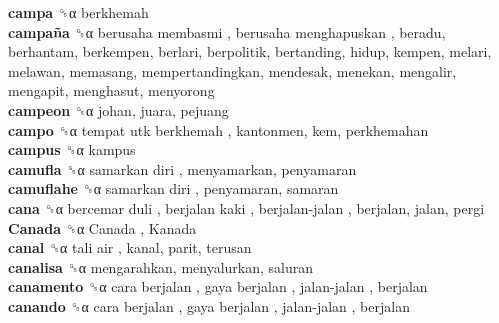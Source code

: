 \textbf{campa} ␝α  berkhemah  \\
\textbf{campaña} ␝α   berusaha membasmi ,  berusaha menghapuskan , beradu, berhantam, berkempen, berlari, berpolitik, bertanding, hidup, kempen, melari, melawan, memasang, mempertandingkan, mendesak, menekan, mengalir, mengapit, menghasut, menyorong  \\
\textbf{campeon} ␝α  johan, juara, pejuang  \\
\textbf{campo} ␝α   tempat utk berkhemah , kantonmen, kem, perkhemahan  \\
\textbf{campus} ␝α  kampus  \\
\textbf{camufla} ␝α   samarkan diri , menyamarkan, penyamaran  \\
\textbf{camuflahe} ␝α   samarkan diri , penyamaran, samaran  \\
\textbf{cana} ␝α   bercemar duli ,  berjalan kaki ,  berjalan-jalan , berjalan, jalan, pergi  \\
\textbf{Canada} ␝α   Canada ,  Kanada   \\
\textbf{canal} ␝α   tali air , kanal, parit, terusan  \\
\textbf{canalisa} ␝α  mengarahkan, menyalurkan, saluran  \\
\textbf{canamento} ␝α   cara berjalan ,  gaya berjalan ,  jalan-jalan , berjalan  \\
\textbf{canando} ␝α   cara berjalan ,  gaya berjalan ,  jalan-jalan , berjalan  \\
